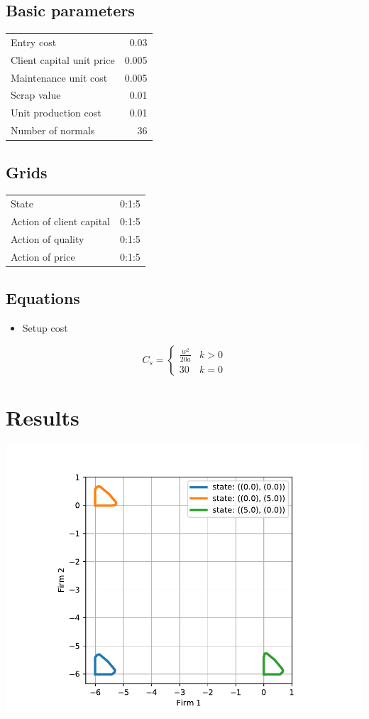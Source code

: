 \documentclass[11pt]{article}
\begin{document}
\subsection{Basic parameters}
\label{sec-2-1}
\begin{center}
\begin{tabular}{|l|r|}
\hline
Entry cost & 0.03\\
Client capital unit price & 0.005\\
Maintenance unit cost & 0.005\\
Scrap value & 0.01\\
Unit production cost & 0.01\\
Number of normals & 36\\
\hline
\end{tabular}
\end{center}

\subsection{Grids}
\label{sec-2-2}
\begin{center}
\begin{tabular}{|l|r|}
\hline
State & 0:1:5\\
Action of client capital & 0:1:5\\
Action of quality & 0:1:5\\
Action of price & 0:1:5\\
\hline
\end{tabular}
\end{center}

\subsection{Equations}
\label{sec-2-3}
\begin{itemize}
\item Setup cost
\end{itemize}
\[ C_{s}=\begin{cases} \frac{w^2}{20a} & k > 0 \\ 30 & k=0 \end{cases}\]

\section{Results}
\label{sec-3}
\includegraphics[width=.9\linewidth]{./img/overlap_0_5_30.pdf} 
\end{document}
